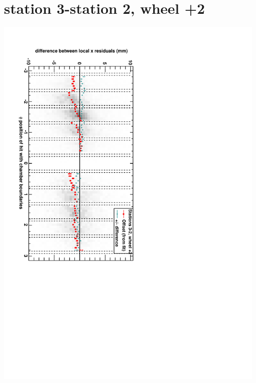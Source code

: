 \documentclass[compress]{beamer}
\begin{document}
\section*{station 3-station 2, wheel +2}
\begin{frame} \vfill \mbox{\hspace{-1 cm}\includegraphics[height=1.2\linewidth, angle=90]{DTrphidiff23VsPhi_whE_slope.pdf}} \end{frame}
\end{document}
